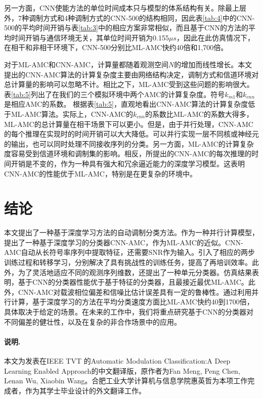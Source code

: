 \documentclass[final]{cvpr}
\begin{document}
\begin{itemize}
 另一方面，CNN使能方法的单位时间成本只与模型的体系结构有关。除最上层外，7种调制方式和4种调制方式的CNN-500的结构相同，因此表\ref{tab:4}中的CNN-500的平均时间开销与表\ref{tab:3}中的相应方案非常相似，而且基于CNN的方法的平均时间开销与通信环境无关，其单位时间开销为0.155$\mu s$，因此在此仿真情况下，在相干和非相干环境下，CNN-500分别比ML-AMC快约40倍和1,700倍。

 对于ML-AMC和CNN-AMC，计算量都随着观测空间$N$的增加而线性增长。本文提出的CNN-AMC算法的计算复杂度主要由网络结构决定，调制方式和信道环境对总计算量的影响可以忽略不计。相比之下，ML-AMC受到这些问题的影响很大。表\ref{tab:5}列出了在我们的三个模拟环境中两个AMC的计算复杂度。符号$k_{m1}$和$k_{cnn}$是相应AMC的系数。
根据表\ref{tab:5}，直观地看出CNN-AMC算法的计算复杂度低于ML-AMC算法。实际上，CNN-AMC的$k_{cnn}$的系数比ML-AMC的系数大得多，ML-AMC的总计算量在相干场景下可以更小。但是，由于并行处理，CNN-AMC的每个推理在实现时的时间开销可以大大降低。可以并行实现一层不同核或神经元的输出，也可以同时处理不同接收序列的分类。另一方面，ML-AMC的计算复杂度容易受到信道环境和调制集的影响。相反，所提出的CNN-AMC的每次推理的时间开销是不变的，作为一种具有强大和冗余逼近能力的深度学习模型。这表明CNN-AMC的性能优于ML-AMC，特别是在更复杂的环境中。
\end{itemize}

\section{结论}\label{conclusion}

本文提出了一种基于深度学习方法的自动调制分类方法。作为一种并行计算模型，提出了一种基于深度学习的分类器CNN-AMC，作为ML-AMC的近似。CNN-AMC自动从长符号率序列中提取特征，还需要SNR作为输入。引入了相应的两步训练过程和转移学习，分别解决了具有挑战性的训练任务，提高了再培训效率。此外，为了灵活地适应不同的观测序列维数，还提出了一种单元分类器。仿真结果表明，基于CNN的分类器性能优于基于特征的分类器，且最接近最优ML-AMC。此外，CNN-AMC对载波相位偏差和信噪比估计误差具有一定的鲁棒性。通过利用并行计算，基于深度学习的方法在平均分类速度方面比ML-AMC快约40到1700倍，具体取决于给定的场景。在未来的工作中，我们将重点研究基于CNN的分类器对不同偏差的健壮性，以及在复杂的非合作场景中的应用。
\paragraph{说明.} 本文为发表在IEEE TVT 的Automatic Modulation Classification:A Deep Learning Enabled Approach的中文翻译版，原作者为Fan Meng, Peng Chen, Lenan Wu, Xiaobin Wang。合肥工业大学计算机与信息学院惠英哲为本项工作完成者，作为其学士毕业设计的外文翻译工作。

{\small
 


}

\end{document}
